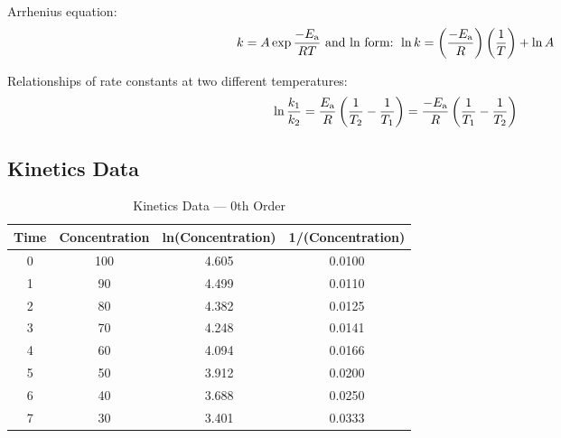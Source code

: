 \documentclass[10pt]{article}
\begin{document}
Arrhenius equation:
\begin{equation*}
k = A \exp{\frac{-E_\textnormal{a}}{RT}} \textnormal{ and ln form: } \ln k = \left(\frac{-E_\textnormal{a}}{R}\right)\left(\frac{1}{T}\right) + \ln A
\end{equation*}

Relationships of rate constants at two different temperatures:
\begin{equation*}
\ln \frac{k_1}{k_2} = \frac{E_\textnormal{a}}{R}\left(\frac{1}{T_2} - \frac{1}{T_1}\right) = \frac{-E_\textnormal{a}}{R}\left(\frac{1}{T_1}-\frac{1}{T_2}\right)
\end{equation*}

\newpage
\subsection{Kinetics Data}

\begin{table}[H]
    \centering
    \caption{Kinetics Data --- 0th Order}
        \begin{tabular}{cccc}
            \toprule
                Time & Concentration & ln(Concentration) & 1/(Concentration) \\
                \midrule
                0     & 100   & 4.605 & 0.0100 \\
                1     & 90    & 4.499 & 0.0110 \\
                2     & 80    & 4.382 & 0.0125 \\
                3     & 70    & 4.248 & 0.0141 \\
                4     & 60    & 4.094 & 0.0166 \\
                5     & 50    & 3.912 & 0.0200 \\
                6     & 40    & 3.688 & 0.0250 \\
                7     & 30    & 3.401 & 0.0333 \\
            \bottomrule
        \end{tabular}
\end{table}
\vspace*{-.7cm}    
{\centering\\[-3.7ex]
\\[-3.6ex]
\\}

\newpage
\end{document}
